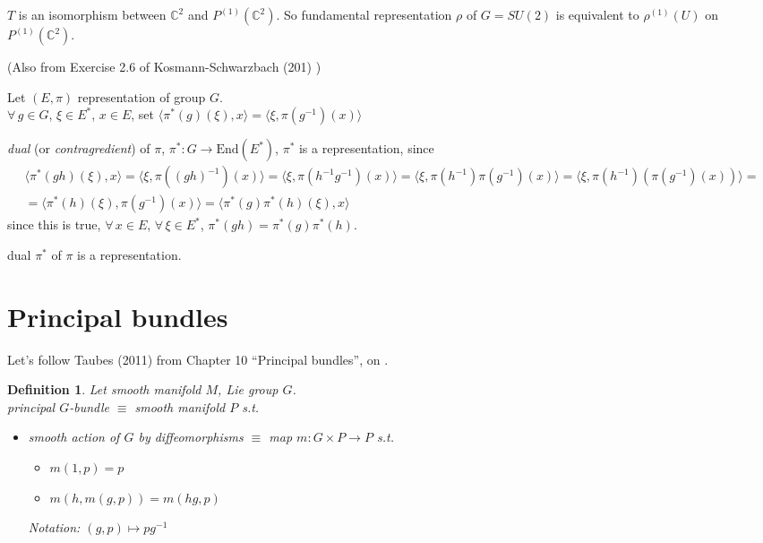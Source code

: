 \documentclass[10pt]{amsart}
\newtheorem{definition}{Definition}
\newcommand{\exercisehead}[1]
  { \smallskip
   \noindent{\small\bf Exercise #1.}
  }
\begin{document}
\begin{multicols*}{2}
$T$ is an isomorphism between $\mathbb{C}^2$ and $P^{(1)}(\mathbb{C}^2)$.  So fundamental representation $\rho$ of $G=SU(2)$ is equivalent to $\rho^{(1)}(U)$ on $P^{(1)}(\mathbb{C}^2)$.  

\exercisehead{23}\cite{JBaezJMuniain1994} (Also from Exercise 2.6 of Kosmann-Schwarzbach (201) \cite{YKosmann-Schwarzbach2010})

Let $(E,\pi)$ representation of group $G$.  \\
$\forall \, g \in G$, $\xi \in E^*$, $x\in E$, set $\langle \pi^*(g)(\xi), x \rangle = \langle \xi, \pi(g^{-1})(x) \rangle$

 \emph{dual} (or \emph{contragredient}) of $\pi$, $\pi^*:G \to \text{End}(E^*)$, $\pi^*$ is a representation, since
\[
\begin{gathered}
  \langle \pi^*(gh)(\xi),x\rangle = \langle \xi, \pi((gh)^{-1})(x) \rangle = \langle \xi, \pi(h^{-1}g^{-1})(x) \rangle = \langle \xi, \pi(h^{-1}) \pi(g^{-1})(x) \rangle = \langle \xi, \pi(h^{-1}) (\pi(g^{-1})(x)) \rangle =  \\
= \langle \pi^*(h)(\xi), \pi(g^{-1})(x) \rangle = \langle \pi^*(g)\pi^*(h)(\xi), x \rangle
\end{gathered}
\]
since this is true, $\forall \, x \in E$, $\forall \, \xi \in E^*$, $\pi^*(gh) = \pi^*(g)\pi^*(h)$.  

dual $\pi^*$ of $\pi$ is a representation.  



\section{Principal bundles}

Let's follow Taubes (2011) from Chapter 10 ``Principal bundles'', on \cite{CTaubes2011}.


\begin{definition}
  Let smooth manifold $M$, Lie group $G$. \\
  \emph{principal} $G$-bundle $\equiv $ smooth manifold $P$ s.t. 
\begin{itemize}
  \item smooth action of $G$ by diffeomorphisms $\equiv$ map $m: G \times P \to P$ s.t. 
    \begin{itemize}
      \item $m(1,p) =p$
      \item $m(h,m(g,p)) = m(hg,p)$
    \end{itemize}
    Notation: $(g,p) \mapsto pg^{-1}$


\end{itemize}
\end{definition}
\end{multicols*}
\end{document}
